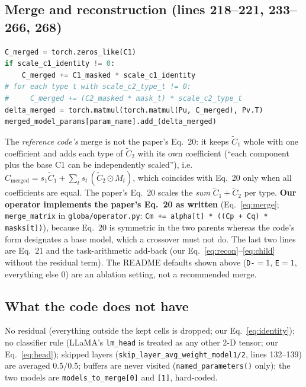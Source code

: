 \documentclass[11pt,a4paper]{article}
\newcommand{\Ct}{\tilde{C}}
\newcommand{\code}[1]{\texttt{#1}}
\begin{document}
\subsection*{Merge and reconstruction (lines 218--221, 233--266, 268)}
\begin{lstlisting}[language=Python]
C_merged = torch.zeros_like(C1)
if scale_c1_identity != 0:
    C_merged += C1_masked * scale_c1_identity
# for each type t with scale_c2_type_t != 0:
#     C_merged += (C2_masked * mask_t) * scale_c2_type_t
delta_merged = torch.matmul(torch.matmul(Pu, C_merged), Pv.T)
merged_model_params[param_name].add_(delta_merged)
\end{lstlisting}
The \emph{reference code's} merge is not the paper's Eq.~20: it keeps $\Ct_1$ whole with one coefficient and adds each type of $\Ct_2$ with its own coefficient (``each component plus the base C1 can be independently scaled''), i.e.\ $C_{\mathrm{merged}}=s_1\Ct_1+\sum_t s_t\,(\Ct_2\odot M_t)$, which coincides with Eq.~20 only when all coefficients are equal. The paper's Eq.~20 scales the \emph{sum} $\Ct_1+\Ct_2$ per type. \textbf{Our operator implements the paper's Eq.~20 as written} (Eq.~\ref{eq:merge}; \code{merge\_matrix} in \code{globa/operator.py}: \code{Cm += alpha[t] * ((Cp + Cq) * masks[t])}), because Eq.~20 is symmetric in the two parents whereas the code's form designates a base model, which a crossover must not do. The last two lines are Eq.~21 and the task-arithmetic add-back (our Eq.~\ref{eq:recon}--\ref{eq:child} without the residual term). The README defaults shown above (\code{D-}$=1$, \code{E}$=1$, everything else $0$) are an ablation setting, not a recommended merge.

\subsection*{What the code does not have}
No residual (everything outside the kept cells is dropped; our Eq.~\ref{eq:identity}); no classifier rule (LLaMA's \code{lm\_head} is treated as any other 2-D tensor; our Eq.~\ref{eq:head}); skipped layers (\code{skip\_layer\_avg\_weight\_model1/2}, lines 132--139) are averaged $0.5/0.5$; buffers are never visited (\code{named\_parameters()} only); the two models are \code{models\_to\_merge[0]} and \code{[1]}, hard-coded.
\end{document}
